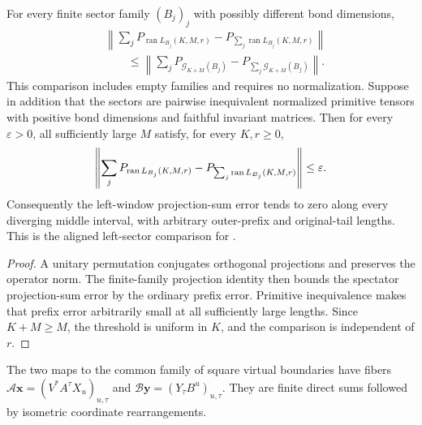 \begin{lemma}
    \label{thm:residual_window_left_sector_sum}
    \leanok
    For every finite sector family $(B_j)_j$ with possibly different bond
    dimensions,
    \begin{align}
         & \left\|\sum_jP_{\operatorname{ran}L_{B_j}(K,M,r)}
        -P_{\sum_j\operatorname{ran}L_{B_j}(K,M,r)}\right\|  \\
         & \qquad\leq
        \left\|\sum_jP_{\mathcal G_{K+M}(B_j)}
        -P_{\sum_j\mathcal G_{K+M}(B_j)}\right\|.
    \end{align}
    This comparison includes empty families and requires no normalization.
    Suppose in addition that the sectors are pairwise inequivalent normalized
    primitive tensors with positive bond dimensions and faithful invariant
    matrices. Then for every $\varepsilon>0$, all sufficiently large $M$ satisfy, for every $K,r\geq0$,
    \begin{align}
        \left\|\sum_jP_{\operatorname{ran}L_{B_j}(K,M,r)}
        -P_{\sum_j\operatorname{ran}L_{B_j}(K,M,r)}\right\|\leq\varepsilon.
        \notag
    \end{align}
    Consequently the left-window projection-sum error tends to zero along
    every diverging middle interval, with arbitrary outer-prefix and
    original-tail lengths. This is the aligned left-sector comparison for
    \cite[Lemma~commutation(i)]{Nachtergaele1996Spectral}.
\end{lemma}
\begin{proof}\leanok
    A unitary permutation conjugates orthogonal projections and preserves
    the operator norm. The finite-family projection identity then bounds
    the spectator projection-sum error by the ordinary prefix error.
    Primitive inequivalence makes that prefix error arbitrarily small at
    all sufficiently large lengths. Since $K+M\geq M$, the threshold is
    uniform in $K$, and the comparison is independent of $r$.
\end{proof}

\begin{definition}
    \label{def:residual_window_overlap_factors}
    \leanok
    The two maps to the common family of square virtual boundaries have fibers
    $\mathcal A\mathbf x=(V^*A^\tau X_u)_{u,\tau}$ and
    $\mathcal B\mathbf y=(Y_\tau B^u)_{u,\tau}$.
    They are finite direct sums followed by isometric coordinate rearrangements.
\end{definition}


